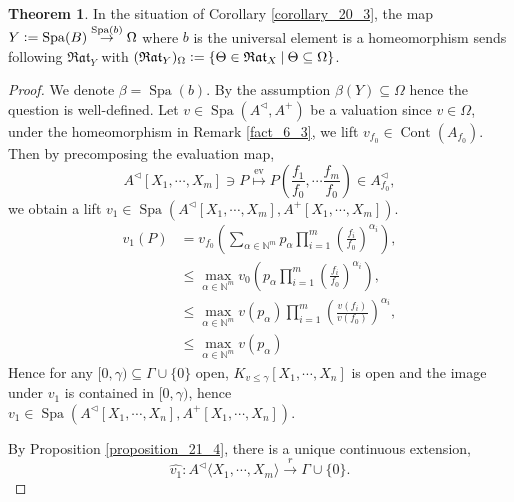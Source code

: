 \documentclass[10pt]{article}
\numberwithin{equation}{section}
\theoremstyle{definition}
\newtheorem{theorem}{Theorem} [subsection]
\DeclareMathOperator{\ev}{ev}
\DeclareMathOperator{\Spa}{Spa}
\DeclareMathOperator{\Cont}{Cont}
\newcommand{\defeq}{\vcentcolon=}
\newcommand{\N}[0]{\mathbb{N}}
\newcommand{\sep}[0]{\:|\:}
\newcommand{\Rat}[0]{\mathfrak{Rat}}
\begin{document}
\begin{theorem}
    \label{theorem_21_1}
    In the situation of Corollary \ref{corollary_20_3}, the map $Y\defeq\Spa(B)\stackrel{\Spa(b)}{\to}\Omega$ where $b$ is the universal element is a homeomorphism sends following $\Rat_Y$ with $(\Rat_Y)_\Omega \defeq\{\Theta\in\Rat_X\sep \Theta\subseteq\Omega\}$.
\end{theorem}
\begin{proof}
We denote $\beta = \Spa(b)$. By the assumption $\beta(Y)\subseteq \Omega$ hence the question is well-defined.
Let $v\in\Spa(A^\triangleleft,A^+)$ be a valuation since $v\in\Omega$, under the homeomorphism in Remark \ref{fact_6_3}, we lift $v_{f_0}\in\Cont(A_{f_0})$.
Then by precomposing the evaluation map,
\begin{equation*}
    A^\triangleleft[X_1,\cdots,X_m]\ni P\stackrel{\ev}{\mapsto}P\left({\frac {f_1} {f_0}},\cdots{\frac {f_m} {f_0}}\right)\in A^\triangleleft_{f_0},
\end{equation*}
we obtain a lift $v_1\in\Spa(A^\triangleleft[X_1,\cdots,X_m],A^+[X_1,\cdots,X_m])$.
\begin{align*}
    v_1(P) &= v_{f_0}\left(\sum_{\alpha\in\N^m}p_\alpha\prod_{i=1}^m\left({\frac {f_i}{f_0}}\right)^{\alpha_i}\right),\\
    &\leq \max_{\alpha\in\N^m}v_0\left(p_\alpha\prod_{i=1}^m\left({\frac {f_i} {f_0}}\right)^{\alpha_i}\right),\\
    & \leq \max_{\alpha\in\N^m}v(p_\alpha)\prod_{i=1}^m\left({\frac {v(f_i)} {v(f_0)}}\right)^{\alpha_i},\\
    &\leq \max_{\alpha\in\N^m}v(p_\alpha) \tag{b}
\end{align*}
Hence for any $[0,\gamma)\subseteq\Gamma\cup\{0\}$ open, $K_{v\leq \gamma}[X_1,\cdots,X_n]$ is open and the image under $v_1$ is contained in $[0,\gamma)$, hence $v_1\in\Spa(A^\triangleleft[X_1,\cdots,X_n],A^+[X_1,\cdots,X_n])$.
\par By Proposition \ref{proposition_21_4}, there is a unique continuous extension,
\begin{equation*}
    \widehat{v_1}:A^\triangleleft\langle X_1,\cdots,X_m\rangle\stackrel{r}{\to}\Gamma\cup\{0\}.
\end{equation*}

\end{proof}
\end{document}
